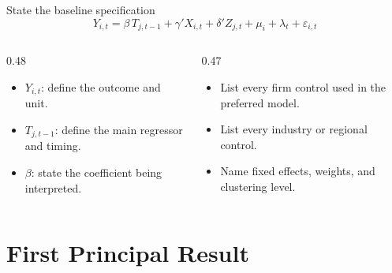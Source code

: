 \documentclass[aspectratio=169,10pt]{beamer}
\begin{document}
\begin{frame}{State the baseline specification}
  \[
    Y_{i,t}
    = \beta\,T_{j,t-1}
    + \gamma'X_{i,t}
    + \delta'Z_{j,t}
    + \mu_i + \lambda_t + \varepsilon_{i,t}
  \]
  \begin{columns}[t,onlytextwidth]
    \begin{column}{0.48\textwidth}
      \begin{itemize}
        \item $Y_{i,t}$: define the outcome and unit.
        \item $T_{j,t-1}$: define the main regressor and timing.
        \item $\beta$: state the coefficient being interpreted.
      \end{itemize}
    \end{column}
    \begin{column}{0.47\textwidth}
      \begin{itemize}
        \item List every firm control used in the preferred model.
        \item List every industry or regional control.
        \item Name fixed effects, weights, and clustering level.
      \end{itemize}
    \end{column}
  \end{columns}
\end{frame}

\section{First Principal Result}
\begin{frame}
\end{frame}
\end{document}
